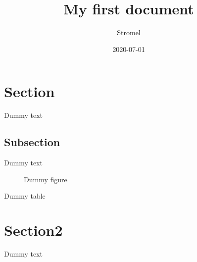 \documentclass{article}
\title{My first document}
\date{2020-07-01}
\author{Stromel}
\begin{document}
	
	\doublespacing
	\tableofcontents
	\singlespacing
	
	\section{Section}
		Dummy text
	
		\subsection{Subsection}
			Dummy text
			
			\begin{figure}
				\caption{Dummy figure}
			\end{figure}
			
			\begin{table}
				\caption{Dummy table}
			\end{table}
	
	\section{Section2}
		Dummy text
	
	\begin{appendix}
		\listoffigures
		\listoftables
	\end{appendix}
\end{document}
